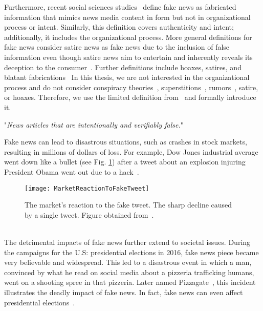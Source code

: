 Furthermore, recent social sciences studies~\parencite{TheScienceOfFakeNews_Lazer, ThePsycologyOfFakeNews_Pennycook} define fake news as fabricated information that mimics news media content in form but not in organizational process or intent. Similarly, this definition covers authenticity and intent; additionally, it includes the organizational process. More general definitions for fake news consider satire news as fake news due to the inclusion of false information even though satire news aim to entertain and inherently reveals its deception to the consumer~\parencite{WhenFakeNewsBecomesReal_Balmas, TheImpactOfRealNewsAboutFakeNews_Brewer, NewsVerificationByExploitingConflictingSocialViewpoints_Jin, FakeNewsOrTruthUsingSatiricalCues_Rubin}. Further definitions include hoaxes, satires, and blatant
fabrications~\parencite{DeceptionDetectionForFakeNews3TypesOfFakeNews_Rubin}
In this thesis, we are not interested in the organizational process and do not consider conspiracy theories~\parencite{ConspiracyTheories_Sunstein}, superstitions~\parencite{Superstition_Lindeman}, rumors~\parencite{RumorsAndHealthCareReform_Berinsky}, satire, or hoaxes. Therefore, we use the limited definition from~\parencite{SocialMediaAndFakeNewsIn2016Election_Allcott} and formally introduce it.
\begin{definition}
    "\emph{News articles that are intentionally and verifiably false.}"~\parencite{SocialMediaAndFakeNewsIn2016Election_Allcott}
\end{definition}
Fake news can lead to disastrous situations, such as crashes in stock markets, resulting in millions of dollars of loss. For example, Dow Jones industrial average went down like a bullet (see Fig. \ref{fig:MarketReactionToFakeTweet}) after a tweet about an explosion injuring President Obama went out due to a hack~\parencite{MarketQuaversAfterFakeAPTweet_ElBoghdady}.
\begin{figure}
    \centering
    \texttt{[image: MarketReactionToFakeTweet]}
    \caption[Market Reaction to Fake Tweet.]{The market's reaction to the fake tweet. The sharp decline caused by a single tweet. Figure obtained from~\parencite{MarketQuaversAfterFakeAPTweet_ElBoghdady}.}\label{fig:MarketReactionToFakeTweet}
\end{figure}\\
The detrimental impacts of fake news further extend to societal issues. During the campaigns for the U.S: presidential elections in 2016, fake news piece became very believable and widespread. This led to a disastrous event in which a man, convinced by what he read on social media about a pizzeria trafficking humans, went on a shooting spree in that pizzeria. Later named Pizzagate~\parencite{Pizzagate_Fisher}, this incident illustrates the deadly impact of fake news. In fact, fake news can even affect presidential elections~\parencite{SocialMediaAndFakeNewsIn2016Election_Allcott, TrumpWonBecauseOfFacebook_Read}.\\
